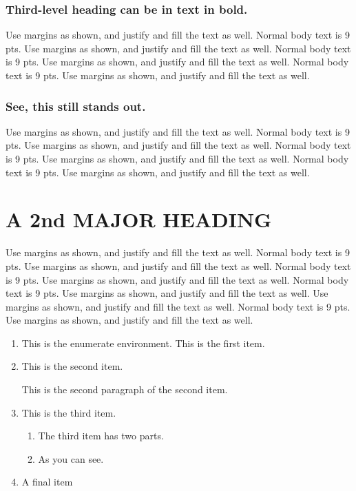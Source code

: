 \subsubsection{Third-level heading can be in text in bold.} Use margins as shown, and justify and fill the text as well.   Normal body text is 9 pts. Use margins as shown, and justify and fill the text as well.   Normal body text is 9 pts. Use margins as shown, and justify and fill the text as well.   Normal body text is 9 pts. Use margins as shown, and justify and fill the text as well.   

\subsubsection{See, this still stands out.} Use margins as shown, and justify and fill the text as well.   Normal body text is 9 pts. Use margins as shown, and justify and fill the text as well.   Normal body text is 9 pts. Use margins as shown, and justify and fill the text as well.   Normal body text is 9 pts. Use margins as shown, and justify and fill the text as well.   

\section{A 2nd MAJOR HEADING}

Use margins as shown, and justify and fill the text as well.   Normal body text is 9 pts. Use margins as shown, and justify and fill the text as well.   Normal body text is 9 pts. Use margins as shown, and justify and fill the text as well.   Normal body text is 9 pts. Use margins as shown, and justify and fill the text as well.   
Use margins as shown, and justify and fill the text as well.   Normal body text is 9 pts. Use margins as shown, and justify and fill the text as well.     

\begin{enumerate}

\item This is the enumerate environment.  This is the first item.

\item This is the second item.

This is the second paragraph of the second item.

\item This is the third item.
\begin{enumerate}
\item The third item has two parts.

\item As you can see.
\end{enumerate}

\item A final item
\end{enumerate}


